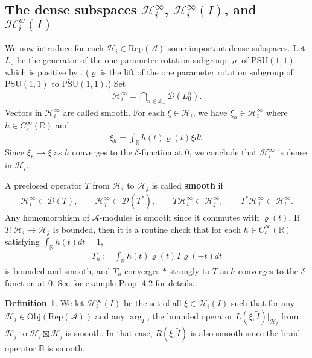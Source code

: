 \documentclass[12pt,a4paper]{article}
\theoremstyle{definition}
\newtheorem{df}{Definition}[subsection]
\theoremstyle{plain}
\newcommand{\mc}{\mathcal}
\newcommand{\wtd}{\widetilde}
\newcommand{\Dom}{\scr D}
\newcommand{\PSU}{\mathrm{PSU}(1,1)}
\newcommand{\UPSU}{\widetilde{\mathrm{PSU}}(1,1)}
\newcommand{\scr}{\mathscr}
\newcommand{\RepA}{\mathrm{Rep}(\mc A)}
\newcommand{\mbb}{\mathbb}
\newcommand{\Obj}{\mathrm{Obj}}
\numberwithin{equation}{subsection}
\begin{document}
\subsection{The dense subspaces $\mc H_i^\infty$, $\mc H_i^\infty(I)$, and $\mc H_i^w(I)$}









We now introduce for each $\mc H_i\in\RepA$ some important dense subspaces. Let $L_0$ be the generator of the one parameter rotation subgroup $\varrho$ of $\UPSU$ which is positive by \cite[Thm. 3.8]{Wei06}. ($\varrho$ is the lift of the one parameter rotation subgroup of $\PSU$ to $\UPSU$.) Set \index{Hi@$\mc H_i^\infty$}
\begin{align}
\mc H_i^\infty=\bigcap_{n\in\mbb Z_+}\Dom(L_0^n).
\end{align}
Vectors in $\mc H_i^\infty$ are called smooth. For each $\xi\in\mc H_i$,  we have $\xi_h\in\mc H_i^\infty$ where $h\in C_c^\infty(\mbb R)$ and
\begin{align}
\xi_h=\int_{\mbb R}h(t)\varrho(t)\xi dt.
\end{align}
Since $\xi_h\rightarrow\xi$ as $h$ converges to the $\delta$-function at $0$, we conclude that $\mc H_i^\infty$ is dense in $\mc H_i$. 

A preclosed operator $T$ from $\mc H_i$ to $\mc H_j$ is called \textbf{smooth} if
\begin{gather}
\mc H_i^\infty\subset\Dom(T),\qquad \mc H_j^\infty\subset\Dom(T^*),\qquad  T\mc H_i^\infty\subset \mc H_j^\infty,\qquad T^*\mc H_j^\infty\subset \mc H_i^\infty.
\end{gather}
Any homomorphism of $\mc A$-modules is smooth since it commutes  with $\varrho(t)$. If $T:\mc H_i\rightarrow\mc H_j$ is  bounded, then it is a routine check that for each $h\in C_c^\infty(\mbb R)$ satisfying $\int_{\mbb R}h(t)dt=1$,
\begin{align}
T_h:=\int_{\mbb R}h(t)\varrho(t)T\varrho(-t)dt
\end{align}
is bounded and smooth, and $T_h$  converges $*$-strongly to $T$  as $h$ converges to the $\delta$-function at $0$. See for example \cite{Gui19b} Prop. 4.2 for details.

\begin{df}
We let $\mc H_i^\infty(I)$  be the set of all $\xi\in\mc H_i(I)$ such that for any $\mc H_j\in\Obj(\RepA)$ and any $\arg_I$, the bounded operator $L (\xi,\wtd I)|_{\mc H_j}$ from $\mc H_j$ to $\mc H_i\boxtimes\mc H_j$ is smooth. In that case, $R(\xi,\wtd I)$ is also smooth since the braid operator $\mbb B$ is smooth.
\end{df}
\end{document}
